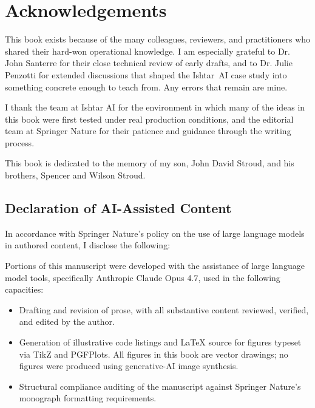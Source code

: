 \chapter*{Acknowledgements}


This book exists because of the many colleagues, reviewers, and
practitioners who shared their hard-won operational knowledge. I am
especially grateful to Dr. John Santerre for their close technical review of
early drafts, and to Dr. Julie Penzotti for extended discussions that shaped the
Ishtar~AI case study into something concrete enough to teach from.
Any errors that remain are mine.

I thank the team at Ishtar AI for the environment in which many
of the ideas in this book were first tested under real production
conditions, and the editorial team at Springer Nature for their
patience and guidance through the writing process.

This book is dedicated to the memory of my son, John David Stroud, and his 
brothers, Spencer and Wilson Stroud.


\section*{Declaration of AI-Assisted Content}

In accordance with Springer Nature's policy on the use of large language
models in authored content, I disclose the following:

Portions of this manuscript were developed with the assistance of large
language model tools, specifically Anthropic Claude
Opus 4.7, used in the following capacities:

\begin{itemize}
  \item Drafting and revision of prose, with all substantive content
        reviewed, verified, and edited by the author.
  \item Generation of illustrative code listings and LaTeX source for
        figures typeset via TikZ and PGFPlots. All figures in this
        book are vector drawings; no figures were produced using
        generative-AI image synthesis.
  \item Structural compliance auditing of the manuscript against
        Springer Nature's monograph formatting requirements.
\end{itemize}

